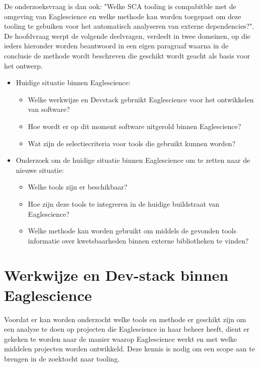 De onderzoeksvraag is dan ook: "Welke SCA tooling is compabitble met de omgeving van Eaglescience en welke methode kan worden toegepast om deze tooling te gebuiken voor het automatisch analyseren van externe dependencies?". De hoofdvraag werpt de volgende deelvragen, verdeelt in twee domeinen, op die ieders hieronder worden beantwoord in een eigen paragraaf waarna in de conclusie de methode wordt beschreven die geschikt wordt geacht als basis voor het ontwerp.
\begin{itemize}
    \item Huidige situatie binnen Eaglescience:
    \begin{itemize}
        \item Welke werkwijze en Dev\-stack gebruikt Eaglescience voor het ontwikkelen van software?
        \item Hoe wordt er op dit moment software uitgerold binnen Eaglescience?
        \item Wat zijn de selectiecriteria voor tools die gebruikt kunnen worden?
    \end{itemize}

    \item Onderzoek om de huidige situatie binnen Eaglescience om te zetten naar de nieuwe situatie:
    \begin{itemize}
        \item Welke tools zijn er beschikbaar?
        \item Hoe zijn deze tools te integreren in de huidige buildstraat van Eaglescience?
        \item Welke methode kan worden gebruikt om middels de gevonden tools informatie over kwetsbaarheden binnen externe bibliotheken te vinden?
    \end{itemize}
\end{itemize}


\section{Werkwijze en Dev-stack binnen Eaglescience}\label{sec:werkwijze-en-dev-stack-binnen-eaglescience}
Voordat er kan worden onderzocht welke tools en methode er geschikt zijn om een analyse te doen op projecten die Eaglescience in haar beheer heeft, dient er gekeken te worden naar de manier waarop Eaglescience werkt en met welke middelen projecten worden ontwikkeld. Deze kennis is nodig om een scope aan te brengen in de zoektocht naar tooling.

